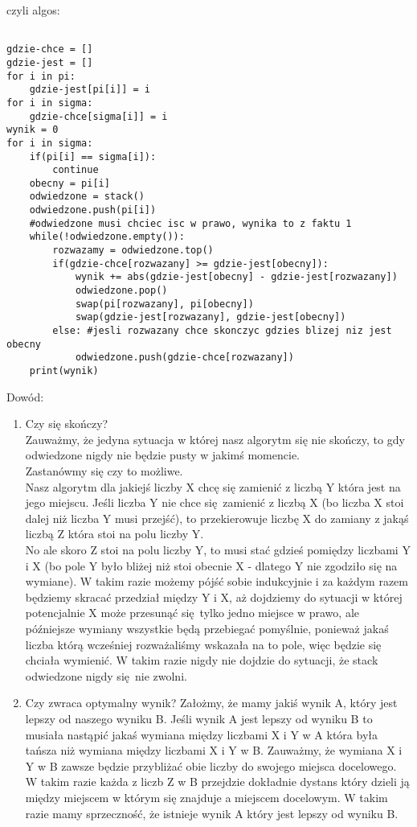 \documentclass[12pt]{article}
\begin{document}
czyli algos:
\begin{lstlisting}

gdzie-chce = []
gdzie-jest = []
for i in pi:
    gdzie-jest[pi[i]] = i
for i in sigma:
    gdzie-chce[sigma[i]] = i 
wynik = 0
for i in sigma:
    if(pi[i] == sigma[i]):
        continue 
    obecny = pi[i]
    odwiedzone = stack() 
    odwiedzone.push(pi[i])
    #odwiedzone musi chciec isc w prawo, wynika to z faktu 1
    while(!odwiedzone.empty()):
        rozwazamy = odwiedzone.top()
        if(gdzie-chce[rozwazany] >= gdzie-jest[obecny]):
            wynik += abs(gdzie-jest[obecny] - gdzie-jest[rozwazany])
            odwiedzone.pop()
            swap(pi[rozwazany], pi[obecny])
            swap(gdzie-jest[rozwazany], gdzie-jest[obecny])
        else: #jesli rozwazany chce skonczyc gdzies blizej niz jest obecny
            odwiedzone.push(gdzie-chce[rozwazany])
    print(wynik)
\end{lstlisting}


Dowód:
\begin{enumerate}
    \item Czy się skończy?\\
    Zauważmy, że jedyna sytuacja w której nasz algorytm się nie skończy, to gdy odwiedzone nigdy nie będzie pusty w jakimś momencie.\\

    Zastanówmy się czy to możliwe.\\

    Nasz algorytm dla jakiejś liczby X chcę się zamienić z liczbą Y która jest na jego miejscu. Jeśli liczba Y nie chce się zamienić z liczbą X (bo liczba X stoi dalej niż liczba Y musi przejść), to przekierowuje liczbę X do zamiany z jakąś liczbą Z która stoi na polu liczby Y.\\

    No ale skoro Z stoi na polu liczby Y, to musi stać gdzieś pomiędzy liczbami Y i X (bo pole Y było bliżej niż stoi obecnie X - dlatego Y nie zgodziło się na wymiane). W takim razie możemy pójść sobie indukcyjnie i za każdym razem będziemy skracać przedział między Y i X, aż dojdziemy do sytuacji w której potencjalnie X może przesunąć się tylko jedno miejsce w prawo, ale późniejsze wymiany wszystkie będą przebiegać pomyślnie, ponieważ jakaś liczba którą wcześniej rozważaliśmy wskazała na to pole, więc będzie się chciała wymienić. W takim razie nigdy nie dojdzie do sytuacji, że stack odwiedzone nigdy się nie zwolni.\\
    \item Czy zwraca optymalny wynik?
    Założmy, że mamy jakiś wynik A, który jest lepszy od naszego wyniku B.
    Jeśli wynik A jest lepszy od wyniku B to musiała nastąpić jakaś wymiana między liczbami X i Y w A która była tańsza niż wymiana między liczbami X i Y w B. 
    Zauważmy, że wymiana X i Y w B zawsze będzie przybliżać obie liczby do swojego miejsca docelowego. W takim razie każda z liczb Z w B przejdzie dokładnie dystans który dzieli ją między miejscem w którym się znajduje a miejscem docelowym.
    W takim razie mamy sprzeczność, że istnieje wynik A który jest lepszy od wyniku B.  
\end{enumerate}
\end{document}

